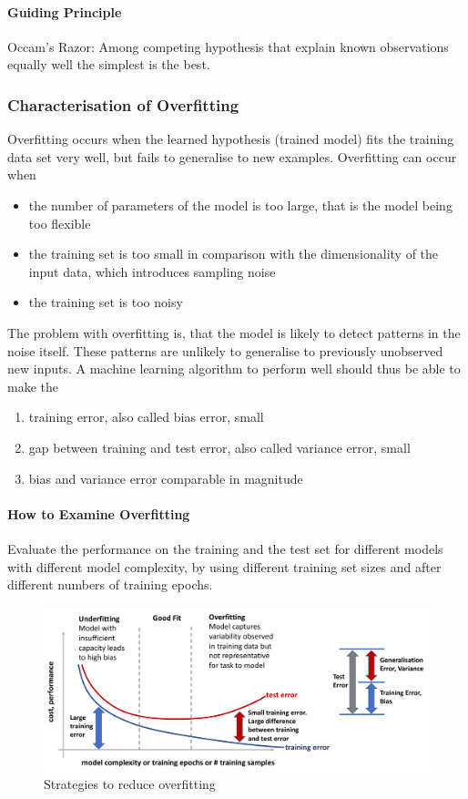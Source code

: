 \documentclass[11pt]{article}
\begin{document}
\paragraph{Guiding Principle} Occam's Razor: Among competing hypothesis that explain known observations equally well the simplest is the best.

\subsubsection{Characterisation of Overfitting}
Overfitting occurs when the learned hypothesis (trained model) fits the training data set very well, but fails to generalise to new examples.
Overfitting can occur when
\begin{itemize}
	\item the number of parameters of the model is too large, that is the model being too flexible
	\item the training set is too small in comparison with the dimensionality of the input data, which introduces sampling noise
	\item the training set is too noisy
\end{itemize}

The problem with overfitting is, that the model is likely to detect patterns in the noise itself. These patterns are unlikely to generalise to previously unobserved new inputs. A machine learning algorithm to perform well should thus be able to make the
\begin{enumerate}
	\item training error, also called bias error, small
	\item gap between training and test error, also called variance error, small
	\item bias and variance error comparable in magnitude
\end{enumerate}

\paragraph{How to Examine Overfitting}
Evaluate the performance on the training and the test set for different models with different model complexity, by using different training set sizes and after different numbers of training epochs.

\begin{figure}[H]
	\centering
	\includegraphics[width=0.9\linewidth,keepaspectratio]{test_training_set_overfitting}
	\caption{Strategies to reduce overfitting}
\end{figure}
\end{document}
